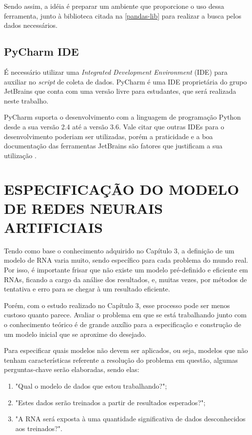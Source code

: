 Sendo assim, a idéia é preparar um ambiente que proporcione o uso dessa ferramenta, junto à biblioteca citada na \autoref{pandas-lib} para realizar a busca pelos dados necessários.


\subsection{PyCharm IDE}
É necessário utilizar uma \textit{Integrated Development Environment} (IDE) para auxiliar no \textit{script} de coleta de dados. PyCharm é uma IDE proprietária do grupo JetBrains que conta com uma versão livre para estudantes, que será realizada neste trabalho.
 
PyCharm suporta o desenvolvimento com a linguagem de programação Python desde a sua versão 2.4 até a versão 3.6. Vale citar que outras IDEs para o desenvolvimento poderiam ser utilizadas, porém a praticidade e a boa documentação das ferramentas JetBrains são fatores que justificam a sua utilização \cite{pycharm}.

\section{ESPECIFICAÇÃO DO MODELO DE REDES NEURAIS ARTIFICIAIS}\label{especifica-modelo}
Tendo como base o conhecimento adquirido no Capítulo 3, a definição de um modelo de RNA varia muito, sendo específico para cada problema do mundo real. Por isso, é importante frisar que não existe um modelo pré-definido e eficiente em RNAs, ficando a cargo da análise dos resultados, e, muitas vezes, por métodos de tentativa e erro para se chegar à um resultado eficiente.
 
Porém, com o estudo realizado no Capítulo 3, esse processo pode ser menos custoso quanto parece. Avaliar o problema em que se está trabalhando junto com o conhecimento teórico é de grande auxílio para a especificação e construção de um modelo inicial que se aproxime do desejado.

Para especificar quais modelos não devem ser aplicados, ou seja, modelos que não tenham características referente a resolução do problema em 	questão, algumas perguntas-chave serão elaboradas, sendo elas:

\begin{enumerate}\label{enumerate-questions}
\item "Qual o modelo de dados que estou trabalhando?";
\item "Estes dados serão treinados a partir de resultados esperados?";
\item "A RNA será exposta à uma quantidade significativa de dados desconhecidos aos treinados?".
\end{enumerate}

